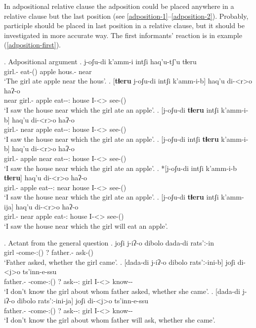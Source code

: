 In adpositional relative clause the adposition could be placed anywhere in a relative clause but the last position (see \ref{adposition-1}--\ref{adposition-2}). Probably, participle should be placed in last position in a relative clause, but it should be investigated in more accurate way. The first informants' reaction is in example (\ref{adposition-first}).

\ex. Adpositional argument
	\ag. j-oʃu-di k'amm-i intʃi haq'u-tʃ'u tɬeru\\
			{girl.\Obl-\Erg} {eat-\Pst(\Aor)} apple {hous.\Obl-\Ads} near\\
			\glt `The girl ate apple near the hous'.
	\bg. 	[\textbf{tɬeru} j-oʃu-di  intʃi k'amm-i-b] haq'u di-<r>o haʔ-o\\
			near {girl.\Obl-\Erg} apple {eat-\Pst-\Ptcp:\Pst} house  {I-<\Nans>\Aff} {see-\Pst(\Aor)} \label{adposition-1}\\
			\glt `I saw the house near which the girl ate an apple'.
	\bg. 	[j-oʃu-di \textbf{tɬeru} intʃi k'amm-i-b] haq'u di-<r>o haʔ-o\\
			{girl.\Obl-\Erg} near apple {eat-\Pst-\Ptcp:\Pst} house  {I-<\Nans>\Aff} {see-\Pst(\Aor)} \label{adposition-first}\\
			\glt `I saw the house near which the girl ate an apple'.
	\bg. 	[j-oʃu-di intʃi \textbf{tɬeru} k'amm-i-b] haq'u di-<r>o haʔ-o\\
			{girl.\Obl-\Erg} apple near  {eat-\Pst-\Ptcp:\Pst} house  {I-<\Nans>\Aff} {see-\Pst(\Aor)} \\
			\glt `I saw the house near which the girl ate an apple'.
	\bg. 	*[j-oʃu-di intʃi k'amm-i-b \textbf{tɬeru}] haq'u di-<r>o haʔ-o\\
			{girl.\Obl-\Erg} apple {eat-\Pst-\Ptcp:\Pst} near house  {I-<\Nans>\Aff} {see-\Pst(\Aor)} \\
			\glt `I saw the house near which the girl ate an apple'. \label{adposition-2}
	\bg. 	[j-oʃu-di \textbf{tɬeru} intʃi k'amm-ija] haq'u di-<r>o haʔ-o\\
			{girl.\Obl-\Erg} near apple {eat-\Ptcp:\Prae} house  {I-<\Nans>\Aff} {see-\Pst(\Aor)} \\
			\glt `I saw the house near which the girl will eat an apple'.

\ex. Actant from the general question
	\ag. joʃi j-iʔ-o dibolo dada-di rats'ː-in\\
			{girl} {\F-come-\Pst:(\Aor)} ? {father.\Obl-\Erg} {ask-\Pst(\Aor)}\\
			\glt `Father asked, whether the girl came'.
	\bg. [dada-di  j-iʔ-o dibolo rats'ː-ini-b] joʃi di-<j>o ts'inn-e-ssu\\
			{father.\Obl-\Erg} {\F-come-\Pst:(\Aor)} ? {ask-\Pst-\Ptcp:\Pst} {girl}  {I-<\F>\Aff} {know-\Hab-\Neg}\\
			\glt `I don't know the girl about whom father asked, whether she came'.
	\bg. [dada-di  j-iʔ-o dibolo rats'ː-ini-ja] joʃi di-<j>o ts'inn-e-ssu\\
			{father.\Obl-\Erg} {\F-come-\Pst:(\Aor)} ? {ask-\Npst-\Ptcp:\Prae} {girl}  {I-<\F>\Aff} {know-\Hab-\Neg}\\
			\glt `I don't know the girl about whom father will ask, whether she came'.

